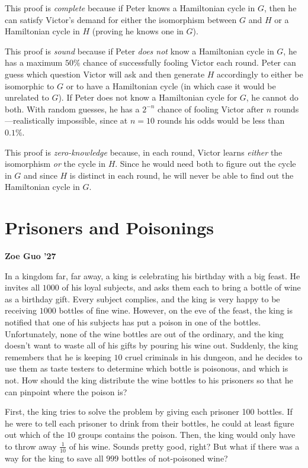 \documentclass{article}
\begin{document}
\begin{multicols}{2}
This proof is \textit{complete} because if Peter knows a Hamiltonian cycle in $G$, then he can satisfy Victor's demand for either the isomorphism between $G$ and $H$ or a Hamiltonian cycle in $H$ (proving he knows one in $G$).

This proof is \textit{sound} because if Peter \textit{does not} know a Hamiltonian cycle in $G$, he has a maximum $50\%$ chance of successfully fooling Victor each round. Peter can guess which question Victor will ask and then generate $H$ accordingly to either be isomorphic to $G$ or to have a Hamiltonian cycle (in which case it would be unrelated to $G$). If Peter does not know a Hamiltonian cycle for $G$, he cannot do both. With random guesses, he has a ${2}^{-n}$ chance of fooling Victor after $n$ rounds---realistically impossible, since at $n=10$ rounds his odds would be less than $0.1\%$.

This proof is \textit{zero-knowledge} because, in each round, Victor learns \textit{either} the isomorphism \textit{or} the cycle in $H$. Since he would need both to figure out the cycle in $G$ and since $H$ is distinct in each round, he will never be able to find out the Hamiltonian cycle in $G$.

\section*{Prisoners and Poisonings}
\noindent\textbf{Zoe Guo '27}
\medbreak

In a kingdom far, far away, a king is celebrating his birthday with a big feast. He invites all $1000$ of his loyal subjects, and asks them each to bring a bottle of wine as a birthday gift. Every subject complies, and the king is very happy to be receiving $1000$ bottles of fine wine. However, on the eve of the feast, the king is notified that one of his subjects has put a poison in one of the bottles. Unfortunately, none of the wine bottles are out of the ordinary, and the king doesn’t want to waste all of his gifts by pouring his wine out. Suddenly, the king remembers that he is keeping $10$ cruel criminals in his dungeon, and he decides to use them as taste testers to determine which bottle is poisonous, and which is not. How should the king distribute the wine bottles to his prisoners so that he can pinpoint where the poison is?

First, the king tries to solve the problem by giving each prisoner 100 bottles. If he were to tell each prisoner to drink from their bottles, he could at least figure out which of the $10$ groups contains the poison. Then, the king would only have to throw away $\frac{1}{10}$ of his wine. Sounds pretty good, right? But what if there was a way for the king to save all $999$ bottles of not-poisoned wine?


\end{multicols}
\end{document}
